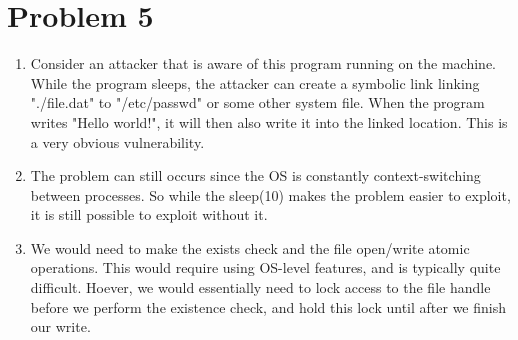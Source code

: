 \documentclass[12pt]{article}
\begin{document}
\pagebreak
\section*{Problem 5}
\begin{enumerate}[label=(\alph*)]
 \item Consider an attacker that is aware of this program running on the machine. While the program sleeps, the attacker can create a symbolic link linking "./file.dat" to "/etc/passwd" or some other system file. When the program writes "Hello world!", it will then also write it into the linked location. This is a very obvious vulnerability.
 \item The problem can still occurs since the OS is constantly context-switching between processes. So while the sleep(10) makes the problem easier to exploit, it is still possible to exploit without it.
 \item We would need to make the exists check and the file open/write atomic operations. This would require using OS-level features, and is typically quite difficult. Hoever, we would essentially need to lock access to the file handle before we perform the existence check, and hold this lock until after we finish our write. 
\end{enumerate}
\end{document}
